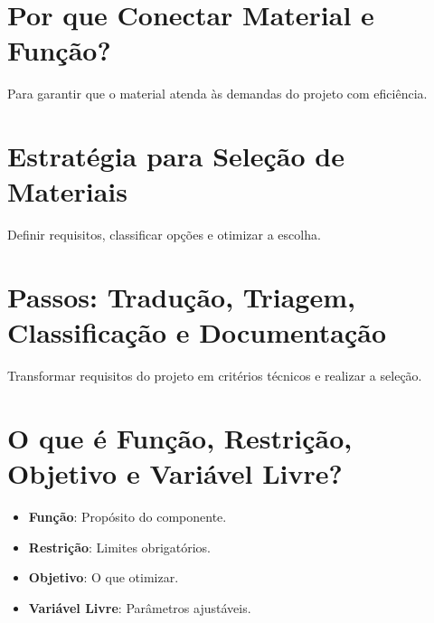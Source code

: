 \section{Por que Conectar Material e Função?}
Para garantir que o material atenda às demandas do projeto com eficiência.

\section{Estratégia para Seleção de Materiais}
Definir requisitos, classificar opções e otimizar a escolha.

\section{Passos: Tradução, Triagem, Classificação e Documentação}
Transformar requisitos do projeto em critérios técnicos e realizar a seleção.

\section{O que é Função, Restrição, Objetivo e Variável Livre?}
\begin{itemize}
    \item \textbf{Função}: Propósito do componente.
    \item \textbf{Restrição}: Limites obrigatórios.
    \item \textbf{Objetivo}: O que otimizar.
    \item \textbf{Variável Livre}: Parâmetros ajustáveis.
\end{itemize}
